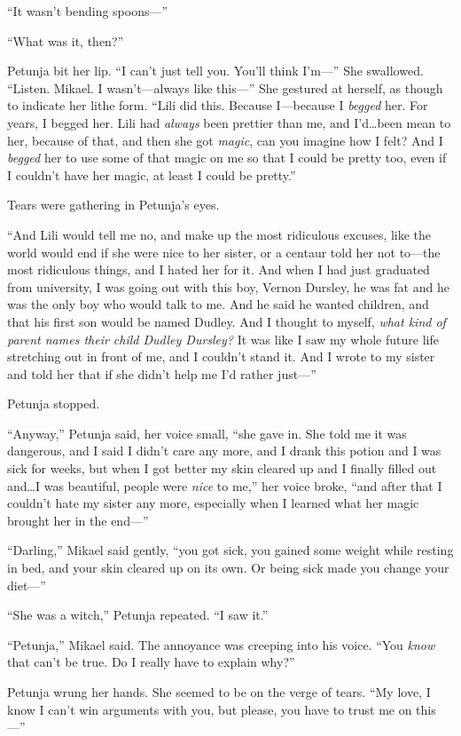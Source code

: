 “It wasn’t bending spoons—”

“What was it, then?”

Petunja bit her lip. “I can’t just tell you. You’ll think I’m—” She swallowed. “Listen. Mikael. I wasn’t—always like this—” She gestured at herself, as though to indicate her lithe form. “Lili did this. Because I—because I \emph{begged} her. For years, I begged her. Lili had \emph{always} been prettier than me, and I’d…been mean to her, because of that, and then she got \emph{magic}, can you imagine how I felt? And I \emph{begged} her to use some of that magic on me so that I could be pretty too, even if I couldn’t have her magic, at least I could be pretty.”

Tears were gathering in Petunja’s eyes.

“And Lili would tell me no, and make up the most ridiculous excuses, like the world would end if she were nice to her sister, or a centaur told her not to—the most ridiculous things, and I hated her for it. And when I had just graduated from university, I was going out with this boy, Vernon Dursley, he was fat and he was the only boy who would talk to me. And he said he wanted children, and that his first son would be named Dudley. And I thought to myself, \emph{what kind of parent names their child Dudley Dursley?} It was like I saw my whole future life stretching out in front of me, and I couldn’t stand it. And I wrote to my sister and told her that if she didn’t help me I’d rather just—”

Petunja stopped.

“Anyway,” Petunja said, her voice small, “she gave in. She told me it was dangerous, and I said I didn’t care any more, and I drank this potion and I was sick for weeks, but when I got better my skin cleared up and I finally filled out and…I was beautiful, people were \emph{nice} to me,” her voice broke, “and after that I couldn’t hate my sister any more, especially when I learned what her magic brought her in the end—”

“Darling,” Mikael said gently, “you got sick, you gained some weight while resting in bed, and your skin cleared up on its own. Or being sick made you change your diet—”

“She was a witch,” Petunja repeated. “I saw it.”

“Petunja,” Mikael said. The annoyance was creeping into his voice. “You \emph{know} that can’t be true. Do I really have to explain why?”

Petunja wrung her hands. She seemed to be on the verge of tears. “My love, I know I can’t win arguments with you, but please, you have to trust me on this—”

